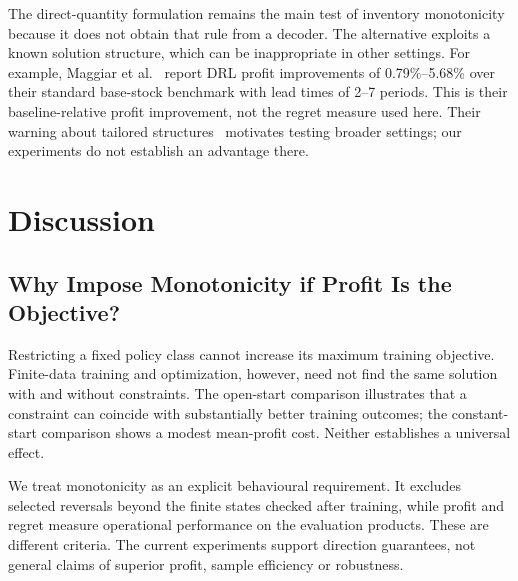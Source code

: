 \documentclass[conference]{IEEEtran}
\begin{document}
The direct-quantity formulation remains the main test of inventory monotonicity because it does not obtain that rule
from a decoder. The alternative exploits a known solution structure, which can be inappropriate in other settings.
For example, Maggiar et al.~\cite[Table~4]{maggiar2025} report DRL profit improvements of 0.79\%--5.68\% over their
standard base-stock benchmark with lead times of 2--7 periods. This is their baseline-relative profit improvement,
not the regret measure used here. Their warning about tailored structures~\cite[Sec.~5.3.1]{maggiar2025} motivates
testing broader settings; our experiments do not establish an advantage there.

\section{Discussion}\label{sec:discussion}
\subsection{Why Impose Monotonicity if Profit Is the Objective?}\label{sec:why-monotone}
Restricting a fixed policy class cannot increase its maximum training objective. Finite-data training and
optimization, however, need not find the same solution with and without constraints. The open-start comparison
illustrates that a constraint can coincide with substantially better training outcomes; the constant-start
comparison shows a modest mean-profit cost. Neither establishes a universal effect.

We treat monotonicity as an explicit behavioural requirement. It excludes selected reversals beyond the finite
states checked after training, while profit and regret measure operational performance on the evaluation products.
These are different criteria. The current experiments support direction guarantees, not general claims of superior
profit, sample efficiency or robustness.
\end{document}
